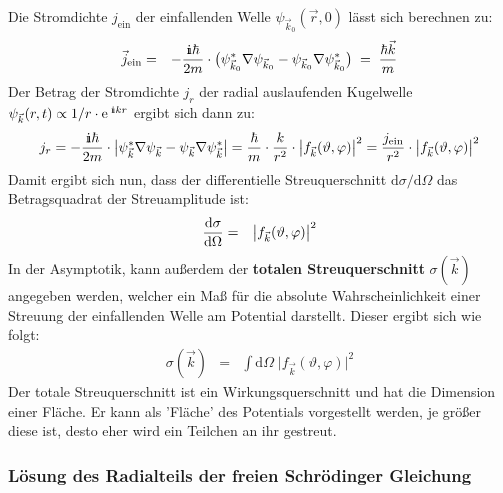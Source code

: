 Die Stromdichte $j_{\text{ein}}$ der einfallenden Welle $\psi_{\vec{k}_0}(\vec{r},0)$ lässt sich berechnen zu:
\begin{eqnarray*}
	\vec{j}_{\text{ein}} &=& -\frac{\I\hbar}{2m}\cdot\big(\psi_{\vec{k}_0}^*\nabla\psi_{\vec{k}_0}-\psi_{\vec{k}_0}\nabla\psi_{\vec{k}_0}^*\big) \;=\; \frac {\hbar \vec{k}}{m}
\end{eqnarray*}
Der Betrag der Stromdichte $j_r$ der radial auslaufenden Kugelwelle $\psi_{\vec{k}}(r,t)\propto 1/r\cdot \e^{\;\I kr}$ ergibt sich dann zu: 
\begin{eqnarray*}
	j_r = -\frac{\I\hbar}{2m}\cdot\big|\psi_{\vec{k}}^*\nabla\psi_{\vec{k}}-\psi_{\vec{k}}\nabla\psi_{\vec{k}}^*\big| = \frac{\hbar}{m}\cdot \frac{k}{r^2}\cdot \big|f_{\vec{k}}(\vartheta, \varphi)\big|^2 = \frac{j_{\text{ein}}}{r^2}\cdot \big|f_{\vec{k}}(\vartheta, \varphi)\big|^2 
\end{eqnarray*}
Damit ergibt sich nun, dass der differentielle Streuquerschnitt $\mathrm{d}\sigma/\mathrm{d}\Omega$ das Betragsquadrat der Streuamplitude ist: 
\begin{eqnarray*}
\frac{\mathrm{d} \sigma}{\mathrm{d} \Omega} &=& \left | f_{\vec{k}}(\vartheta, \varphi) \right|^2
\end{eqnarray*}
In der Asymptotik, kann außerdem der {\bf totalen Streuquerschnitt} $\sigma(\vec{k})$ angegeben werden, welcher ein Maß für die absolute Wahrscheinlichkeit einer Streuung der einfallenden Welle am Potential darstellt. Dieser ergibt sich wie folgt: 
\begin{eqnarray*} 
	\sigma(\vec{k}) &=& \int\mathrm{d}\Omega\; \big|f_{\vec k}(\vartheta,\varphi)\big|^2
\end{eqnarray*}
Der totale Streuquerschnitt ist ein Wirkungsquerschnitt und hat die Dimension einer Fläche. Er kann als 'Fläche' des Potentials vorgestellt werden, je größer diese ist, desto eher wird ein Teilchen an ihr gestreut. 


\subsubsection{Lösung des Radialteils der freien Schrödinger Gleichung}

